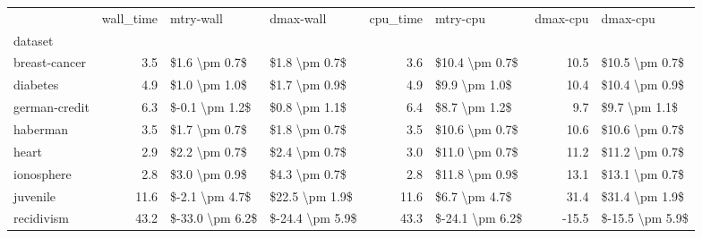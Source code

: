 \begin{tabular}{lrllrlrl}
\toprule
{} &  wall\_time &        mtry-wall &        dmax-wall &  cpu\_time &         mtry-cpu &  dmax-cpu &        dmax-cpu  \\
dataset       &            &                  &                  &           &                  &           &                  \\
\midrule
breast-cancer &        3.5 &    \$1.6 \textbackslash pm 0.7\$ &    \$1.8 \textbackslash pm 0.7\$ &       3.6 &   \$10.4 \textbackslash pm 0.7\$ &      10.5 &   \$10.5 \textbackslash pm 0.7\$ \\
diabetes      &        4.9 &    \$1.0 \textbackslash pm 1.0\$ &    \$1.7 \textbackslash pm 0.9\$ &       4.9 &    \$9.9 \textbackslash pm 1.0\$ &      10.4 &   \$10.4 \textbackslash pm 0.9\$ \\
german-credit &        6.3 &   \$-0.1 \textbackslash pm 1.2\$ &    \$0.8 \textbackslash pm 1.1\$ &       6.4 &    \$8.7 \textbackslash pm 1.2\$ &       9.7 &    \$9.7 \textbackslash pm 1.1\$ \\
haberman      &        3.5 &    \$1.7 \textbackslash pm 0.7\$ &    \$1.8 \textbackslash pm 0.7\$ &       3.5 &   \$10.6 \textbackslash pm 0.7\$ &      10.6 &   \$10.6 \textbackslash pm 0.7\$ \\
heart         &        2.9 &    \$2.2 \textbackslash pm 0.7\$ &    \$2.4 \textbackslash pm 0.7\$ &       3.0 &   \$11.0 \textbackslash pm 0.7\$ &      11.2 &   \$11.2 \textbackslash pm 0.7\$ \\
ionosphere    &        2.8 &    \$3.0 \textbackslash pm 0.9\$ &    \$4.3 \textbackslash pm 0.7\$ &       2.8 &   \$11.8 \textbackslash pm 0.9\$ &      13.1 &   \$13.1 \textbackslash pm 0.7\$ \\
juvenile      &       11.6 &   \$-2.1 \textbackslash pm 4.7\$ &   \$22.5 \textbackslash pm 1.9\$ &      11.6 &    \$6.7 \textbackslash pm 4.7\$ &      31.4 &   \$31.4 \textbackslash pm 1.9\$ \\
recidivism    &       43.2 &  \$-33.0 \textbackslash pm 6.2\$ &  \$-24.4 \textbackslash pm 5.9\$ &      43.3 &  \$-24.1 \textbackslash pm 6.2\$ &     -15.5 &  \$-15.5 \textbackslash pm 5.9\$ \\
\bottomrule
\end{tabular}
